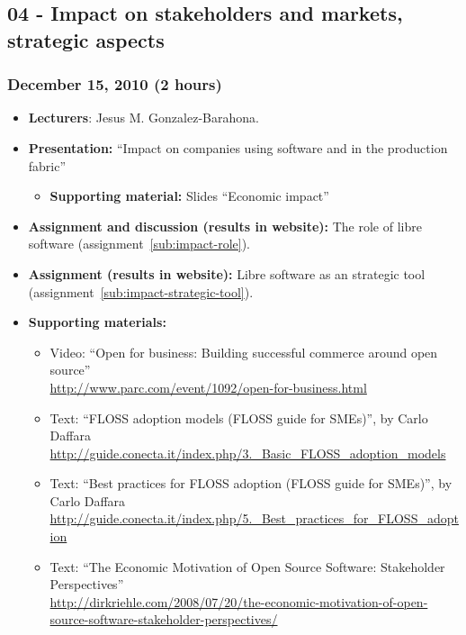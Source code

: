 \documentclass[a4paper]{article}
\begin{document}
\subsection{04 - Impact on stakeholders and markets, strategic aspects}

\subsubsection{December 15, 2010 (2 hours)}

\begin{itemize}
\item \textbf{Lecturers}: Jesus M. Gonzalez-Barahona.
\item \textbf{Presentation:} ``Impact on companies using software and in the production fabric''
  \begin{itemize}
  \item \textbf{Supporting material:} Slides ``Economic impact''
  \end{itemize}
\item \textbf{Assignment and discussion (results in website):} The role of libre software (assignment~\ref{sub:impact-role}).
\item \textbf{Assignment (results in website):} Libre software as an strategic tool  (assignment~\ref{sub:impact-strategic-tool}).
\item \textbf{Supporting materials:} 
  \begin{itemize}
  \item Video: ``Open for business: Building successful commerce around open source'' \\
    \url{http://www.parc.com/event/1092/open-for-business.html}
  \item Text: ``FLOSS adoption models (FLOSS guide for SMEs)'', by Carlo Daffara \\
    \url{http://guide.conecta.it/index.php/3._Basic_FLOSS_adoption_models}
  \item Text: ``Best practices for FLOSS adoption (FLOSS guide for SMEs)'', by Carlo Daffara \\
    \url{http://guide.conecta.it/index.php/5._Best_practices_for_FLOSS_adoption}
  \item Text: ``The Economic Motivation of Open Source Software: Stakeholder Perspectives'' \\
    \url{http://dirkriehle.com/2008/07/20/the-economic-motivation-of-open-source-software-stakeholder-perspectives/}
  \end{itemize}
  
\end{itemize}
\end{document}
